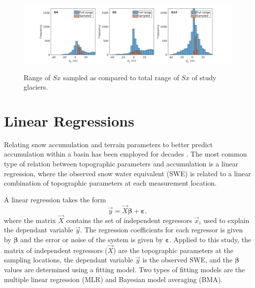 \documentclass[12pt]{article}
\begin{document}
\begin{landscape}
\begin{figure}
	\centering
	\includegraphics[height = 0.4\textwidth]{SampledRangeTopo_Sx.png}\\
	\caption{Range of $Sx$ sampled as compared to total range of $Sx$ of study glaciers.}
	\label{sampledRange:Sx}
\end{figure}

\end{landscape}


\section{Linear Regressions}

Relating snow accumulation and terrain parameters to better predict accumulation within a basin has been employed for decades \citep[e.g.][]{Woo1978, Molotch2005, McGrath2015}. The most common type of relation between topographic parameters and accumulation is a linear regression, where the observed snow water equivalent (SWE) is related to a linear combination of topographic parameters at each measurement location. 

A linear regression takes the form
\begin{equation}
\vec{y} = \vec{X} \bm{\beta} + \bm{\varepsilon},
\end{equation}
where the matrix $\vec{X}$ contains the set of independent regressors $\vec{x}_i$ used to explain the dependant variable $\vec{y}$. The regression coefficients for each regressor is given by $\bm{\beta}$ and the error or noise of the system is given by $\bm{\varepsilon}$. Applied to this study, the matrix of independent regressors ($\vec{X}$) are the topographic parameters at the sampling locations, the dependant variable $\vec{y}$ is the observed SWE, and the  $\bm{\beta}$ values are determined using a fitting model. Two types of fitting models are the multiple linear regression (MLR) and Bayesian model averaging (BMA).
\end{document}
